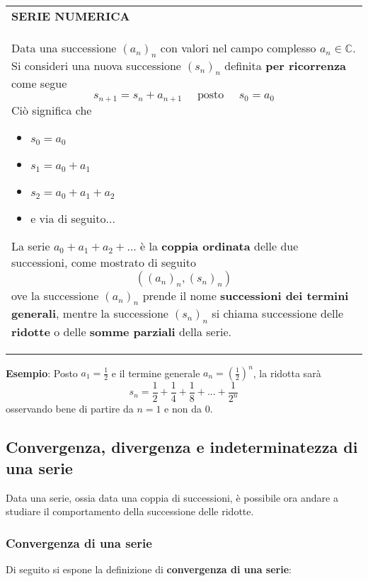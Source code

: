 \documentclass[a4paper]{extarticle}
\renewcommand\arraystretch{}
\begin{document}
\vspace{1em}
\setlength{\tabcolsep}{14pt}
\renewcommand{\arraystretch}{2}
\noindent
\begin{tabularx}{\textwidth}{@{}|P|@{}}
    \hline
    {\textbf{SERIE NUMERICA}}\\
    \parbox{\linewidth}{Data una successione $(a_n)_n$ con valori nel campo complesso $a_n \in \mathbb{C}$. Si consideri una nuova successione $(s_n)_n$ definita \textbf{per ricorrenza} come segue
    \[s_{n+1}=s_n+a_{n+1} \hspace{1em} \text{ posto } \hspace{1em} s_0=a_0\]
    Ciò significa che
    \begin{itemize}
        \item $s_0 = a_0$
        \item $s_1 = a_0 + a_1$
        \item $s_2 = a_0 + a_1 + a_2$
        \item e via di seguito...
    \end{itemize}
    La serie $a_0+a_1+a_2+...$ è la \textbf{coppia ordinata} delle due successioni, come mostrato di seguito
    \[\left((a_n)_n, (s_n)_n\right)\]
    ove la successione $(a_n)_n$ prende il nome \textbf{successioni dei termini generali}, mentre la successione $(s_n)_n$ si chiama successione delle \textbf{ridotte} o delle \textbf{somme parziali} della serie. \vspace{3mm}}\\
    \hline
\end{tabularx}

\vspace{2em}
\noindent
\textbf{Esempio}: Posto $a_1=\frac{1}{2}$ e il termine generale $a_n=\left(\frac{1}{2}\right)^n$, la ridotta sarà
\[s_n=\frac{1}{2}+\frac{1}{4}+\frac{1}{8}+...+\frac{1}{2^n}\]
osservando bene di partire da $n=1$ e non da $0$.

\vspace{1em}
\noindent
\subsection{Convergenza, divergenza e indeterminatezza di una serie}
Data una serie, ossia data una coppia di successioni, è possibile ora andare a studiare il comportamento della successione delle ridotte.

\vspace{1em}
\noindent
\subsubsection{Convergenza di una serie}
Di seguito si espone la definizione di \textbf{convergenza di una serie}:
\end{document}
